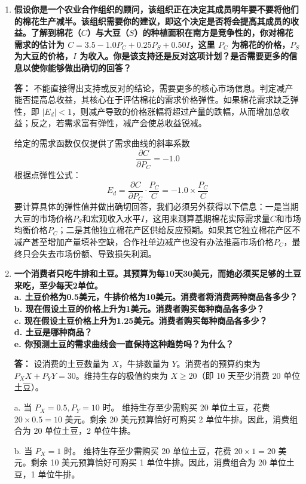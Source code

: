 \begin{enumerate}[label=\textbf{\arabic*.}, leftmargin=*]
	\item \textbf{假设你是一个农业合作组织的顾问，该组织正在决定其成员明年要不要将他们的棉花生产减半。该组织需要你的建议，即这个决定是否将会提高其成员的收益。了解到棉花（$C$）与大豆（$S$）的种植面积在南方是竞争性的，你对棉花需求的估计为 $C=3.5-1.0P_C+0.25P_S+0.50I$，这里 $P_C$ 为棉花的价格，$P_S$ 为大豆的价格，$I$ 为收入。你是该支持还是反对这项计划？是否需要更多的信息以使你能够做出确切的回答？}
	
	\textbf{答：}
	不能直接得出支持或反对的结论，需要更多的核心市场信息。判定减产能否提高总收益，其核心在于评估棉花的需求价格弹性。如果棉花需求缺乏弹性，即 $|E_d| < 1$，则减产导致的价格涨幅将超过产量的跌幅，从而增加总收益；反之，若需求富有弹性，减产会使总收益锐减。
	
	给定的需求函数仅仅提供了需求曲线的斜率系数 
	$$\frac{\partial C}{\partial P_C} = -1.0$$
	根据点弹性公式：
	$$ E_d = \frac{\partial C}{\partial P_C} \cdot \frac{P_C}{C} = -1.0 \times \frac{P_C}{C} $$
	要计算具体的弹性值并做出确切回答，我们必须另外获得以下信息：一是当期大豆的市场价格$P_S$和宏观收入水平$I$，这用来测算基期棉花实际需求量$C$和市场均衡价格$P_C$；二是其他独立棉花产区供给反应预期。如果其它独立棉花产区不减产甚至增加产量填补空缺，合作社单边减产也没有办法推高市场价格$P_C$，最终只会失去市场份额、导致损失利润。
	
	\newpage
	\item \textbf{一个消费者只吃牛排和土豆。其预算为每10天30美元，而她必须买足够的土豆来吃，至少每天2单位。\\
		a. 土豆价格为0.5美元，牛排价格为10美元。消费者将消费两种商品各多少？\\
		b. 现在假设土豆的价格上升为1美元。消费者购买每种商品各多少？\\
		c. 现在假设土豆价格上升为1.25美元。消费者购买每种商品各多少？\\
		d. 土豆是哪种商品？\\
		e. 你预测土豆的需求曲线会一直保持这种趋势吗？为什么？}
	
	\textbf{答：}
	设消费的土豆数量为 $X$，牛排数量为 $Y$。消费者的预算约束为 $P_X X + P_Y Y = 30$。维持生存的极值约束为 $X \ge 20$（即 10 天至少消费 20 单位土豆）。
	
	a. 当 $P_X = 0.5, P_Y = 10$ 时。
	维持生存至少需购买 20 单位土豆，花费 $20 \times 0.5 = 10$ 美元。剩余 20 美元预算恰好可购买 2 单位牛排。因此，消费组合为 20 单位土豆，2 单位牛排。
	
	b. 当 $P_X = 1$ 时。
	维持生存至少需购买 20 单位土豆，花费 $20 \times 1 = 20$ 美元。剩余 10 美元预算恰好可购买 1 单位牛排。因此，消费组合为 20 单位土豆，1 单位牛排。
	

\end{enumerate}
